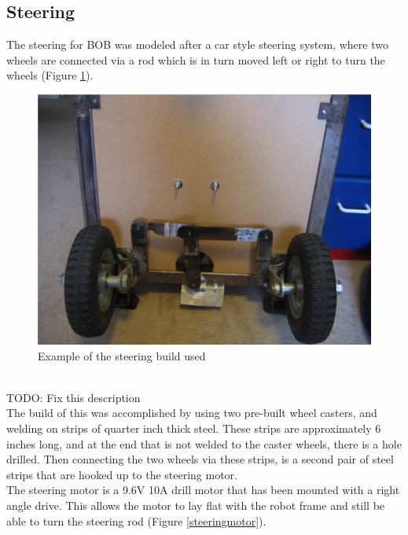\documentclass{article}
\begin{document}
\subsection{Steering}
The steering for BOB was modeled after a car style steering system, where two wheels are connected via a rod which is in turn moved left or right to turn the wheels (Figure \ref{steering}).
\begin{figure}[htp]
  \begin{center}
\includegraphics[scale=0.25]{steering}
  \end{center}
  \caption{Example of the steering build used}
\label{steering}
\end{figure}\\
TODO: Fix this description\\
The build of this was accomplished by using two pre-built wheel casters, and welding on strips of quarter inch thick steel. These strips are approximately 6 inches long, and at the end that is not welded to the caster wheels, there is a hole drilled. Then connecting the two wheels via these strips, is a second pair of steel strips that are hooked up to the steering motor.\\
The steering motor is a 9.6V 10A drill motor that has been mounted with a right angle drive. This allows the motor to lay flat with the robot frame and still be able to turn the steering rod (Figure \ref{steeringmotor}).
\end{document}
